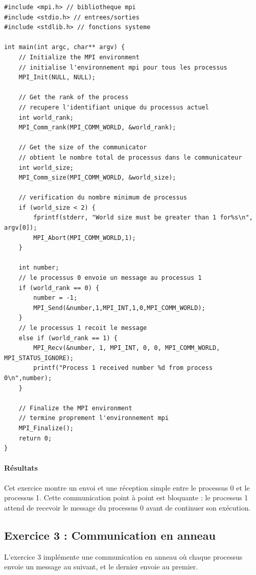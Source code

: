 \documentclass[a4paper,11pt]{article}
\begin{document}
\begin{lstlisting}[caption=Exercice 2 : Communication point à point]
#include <mpi.h> // bibliotheque mpi
#include <stdio.h> // entrees/sorties
#include <stdlib.h> // fonctions systeme

int main(int argc, char** argv) {
    // Initialize the MPI environment
    // initialise l'environnement mpi pour tous les processus
    MPI_Init(NULL, NULL);

    // Get the rank of the process
    // recupere l'identifiant unique du processus actuel
    int world_rank;
    MPI_Comm_rank(MPI_COMM_WORLD, &world_rank);

    // Get the size of the communicator
    // obtient le nombre total de processus dans le communicateur
    int world_size;
    MPI_Comm_size(MPI_COMM_WORLD, &world_size);

    // verification du nombre minimum de processus
    if (world_size < 2) {
        fprintf(stderr, "World size must be greater than 1 for%s\n", argv[0]);
        MPI_Abort(MPI_COMM_WORLD,1);
    }

    int number;
    // le processus 0 envoie un message au processus 1
    if (world_rank == 0) {
        number = -1;
        MPI_Send(&number,1,MPI_INT,1,0,MPI_COMM_WORLD);
    }
    // le processus 1 recoit le message
    else if (world_rank == 1) {
        MPI_Recv(&number, 1, MPI_INT, 0, 0, MPI_COMM_WORLD, MPI_STATUS_IGNORE);
        printf("Process 1 received number %d from process 0\n",number);
    }

    // Finalize the MPI environment
    // termine proprement l'environnement mpi
    MPI_Finalize();
    return 0;
}
\end{lstlisting}

\paragraph{Résultats} Cet exercice montre un envoi et une réception simple entre le processus 0 et le processus 1. Cette communication point à point est bloquante : le processus 1 attend de recevoir le message du processus 0 avant de continuer son exécution.

\subsection{Exercice 3 : Communication en anneau}

L'exercice 3 implémente une communication en anneau où chaque processus envoie un message au suivant, et le dernier envoie au premier.
\end{document}
